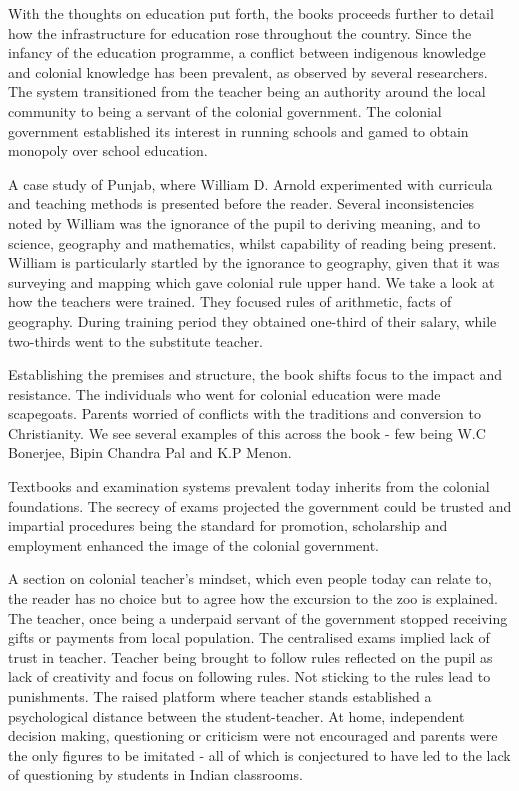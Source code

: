 \documentclass[a4paper]{article}
\begin{document}
    With the thoughts on education put forth, the books
    proceeds further to detail how the infrastructure
    for education rose throughout the country. Since the
    infancy of the education programme, a conflict
    between indigenous knowledge and colonial knowledge
    has been prevalent, as observed by several
    researchers. The system transitioned from the
    teacher being an authority around the local
    community to being a servant of the colonial
    government. The colonial government established its
    interest in running schools and gamed to obtain
    monopoly over school education.


    A case study of Punjab, where William D. Arnold
    experimented with curricula and teaching methods is
    presented before the reader. Several inconsistencies
    noted by William was the ignorance of the pupil to
    deriving meaning, and to science, geography and
    mathematics, whilst capability of reading being
    present. William is particularly startled by the
    ignorance to geography, given that it was surveying
    and mapping which gave colonial rule upper hand. We
    take a look at how the teachers were trained. They
    focused rules of arithmetic, facts of geography.
    During training period they obtained one-third of
    their salary, while two-thirds went to the
    substitute teacher.


    Establishing the premises and structure, the book
    shifts focus to the impact and resistance. The
    individuals who went for colonial education were
    made scapegoats. Parents worried of conflicts with
    the traditions and conversion to Christianity. We
    see several examples of this across the book - few
    being W.C Bonerjee, Bipin Chandra Pal and K.P Menon.


    Textbooks and examination systems prevalent today
    inherits from the colonial foundations. The secrecy
    of exams projected the government could be trusted
    and impartial procedures being the standard for
    promotion, scholarship and employment enhanced the
    image of the colonial government.


    A section on colonial teacher's mindset, which even
    people today can relate to, the reader has no choice
    but to agree how the excursion to the zoo is
    explained. The teacher, once being a underpaid
    servant of the government stopped receiving gifts or
    payments from local population. The centralised
    exams implied lack of trust in teacher. Teacher
    being brought to follow rules reflected on the pupil
    as lack of creativity and focus on following rules.  
    Not sticking to the rules lead to punishments. The
    raised platform where teacher stands established a
    psychological distance between the student-teacher.
    At home, independent decision making, questioning or
    criticism were not encouraged and parents were the
    only figures to be imitated - all of which is
    conjectured to have led to the lack of questioning
    by students in Indian classrooms.
\end{document}
